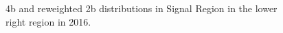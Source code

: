 \begin{figure}[ht]
 
 
    \caption{4b and reweighted 2b distributions in Signal Region in the lower right region in 2016.}
    \label{fig:lower-right-4b-SR-2016}
\end{figure}


